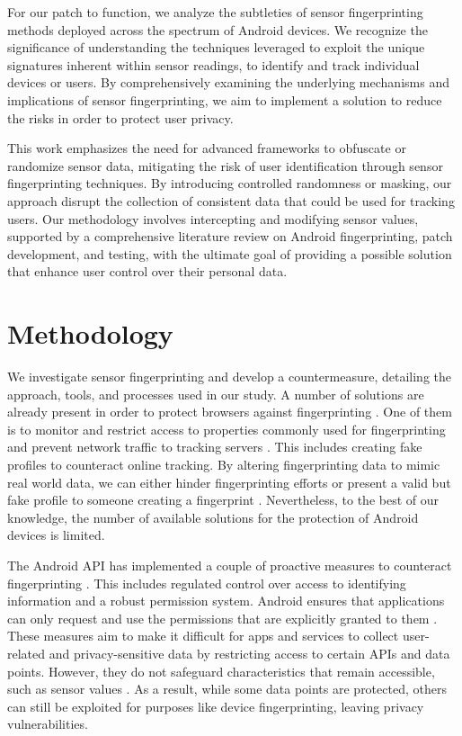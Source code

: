 \documentclass[11pt,
  oneside,openany,    %
]{scrreprt}
\begin{document}
For our patch to function, we analyze the subtleties of sensor fingerprinting methods deployed across the spectrum of Android devices. 
We recognize the significance of understanding the techniques leveraged to exploit the unique signatures inherent within sensor readings, to identify and track individual devices or users. 
By comprehensively examining the underlying mechanisms and implications of sensor fingerprinting, we aim to implement a solution to reduce the risks in order to protect user privacy.

This work emphasizes the need for advanced frameworks to obfuscate or randomize sensor data, mitigating the risk of user identification through sensor fingerprinting techniques.
By introducing controlled randomness or masking, our approach disrupt the collection of consistent data that could be used for tracking users.
Our methodology involves intercepting and modifying sensor values, supported by a comprehensive literature review on Android fingerprinting, patch development, and testing, with the ultimate goal of providing a possible solution that enhance user control over their personal data.

\chapter{Methodology}
\label{chap:methodology}
We investigate sensor fingerprinting and develop a countermeasure, detailing the approach, tools, and processes used in our study.
A number of solutions are already present in order to protect browsers against fingerprinting \cite{DBLP:conf/secrypt/PolcakSMHM23, DBLP:conf/dbsec/FaizKhademiZW15, DBLP:conf/www/NikiforakisJL15, DBLP:conf/esorics/TorresJM15}. 
One of them is to monitor and restrict access to properties commonly used for fingerprinting and prevent network traffic to tracking servers \cite{DBLP:conf/secrypt/PolcakSMHM23}. 
This includes creating fake profiles to counteract online tracking. 
By altering fingerprinting data to mimic real world data, we can either hinder fingerprinting efforts or present a valid but fake profile to someone creating a fingerprint \cite{DBLP:conf/nbis/FioreCSP14}.
Nevertheless, to the best of our knowledge, the number of available solutions for the protection of Android devices is limited.

The Android API has implemented a couple of proactive measures to counteract fingerprinting \cite{android_privacy_10}.
This includes regulated control over access to identifying information and a robust permission system. 
Android ensures that applications can only request and use the permissions that are explicitly granted to them \cite{android_privacy_11}.
These measures aim to make it difficult for apps and services to collect user-related and privacy-sensitive data by restricting access to certain APIs and data points.
However, they do not safeguard characteristics that remain accessible, such as sensor values \cite{DBLP:journals/access/WuWWLY16}.
As a result, while some data points are protected, others can still be exploited for purposes like device fingerprinting, leaving privacy vulnerabilities.
\end{document}
